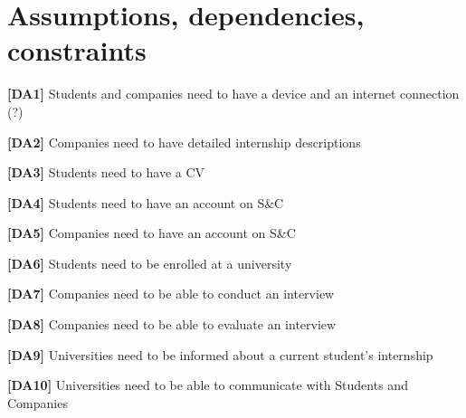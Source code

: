 \section{Assumptions, dependencies, constraints}
\textbf{[DA1] }Students and companies need to have a device and an internet connection (?)

\textbf{[DA2]} Companies need to have detailed internship descriptions

\textbf{[DA3]} Students need to have a CV

\textbf{[DA4]} Students need to have an account on S\&C

\textbf{[DA5]} Companies need to have an account on S\&C

\textbf{[DA6]} Students need to be enrolled at a university 

\textbf{[DA7]} Companies need to be able to conduct an interview

\textbf{[DA8]} Companies need to be able to evaluate an interview

\textbf{[DA9]} Universities need to be informed about a current student's internship

\textbf{[DA10]} Universities need to be able to communicate with Students and Companies
